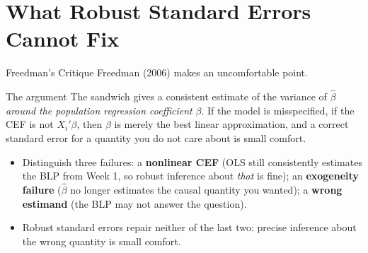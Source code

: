 \documentclass[aspectratio=169,11pt,xcolor=dvipsnames]{beamer}
\newcommand{\srct}[1]{#1}                               %
\begin{document}
\section[Limits]{What Robust Standard Errors Cannot Fix}
\begin{frame}\sectionpage\end{frame}

\begin{frame}{Freedman's Critique}
\srct{Freedman (2006)} makes an uncomfortable point.
\vskip4pt
\begin{block}{The argument}
The sandwich gives a consistent estimate of the variance of $\hat\beta$
\emph{around the population regression coefficient} $\beta$. If the model is
misspecified, if the CEF is not $X_i'\beta$, then $\beta$ is merely the
best linear approximation, and a correct standard error for a quantity you do not
care about is small comfort.
\end{block}
\vskip4pt
\begin{itemize}\itemsep3pt
  \item Distinguish three failures: a \textbf{nonlinear CEF} (OLS still
        consistently estimates the BLP from Week 1, so robust inference about
        \emph{that} is fine); an \textbf{exogeneity failure} ($\hat\beta$ no
        longer estimates the causal quantity you wanted); a \textbf{wrong
        estimand} (the BLP may not answer the question).
  \item Robust standard errors repair neither of the last two: precise
        inference about the wrong quantity is small comfort.
\end{itemize}
\end{frame}
\end{document}
